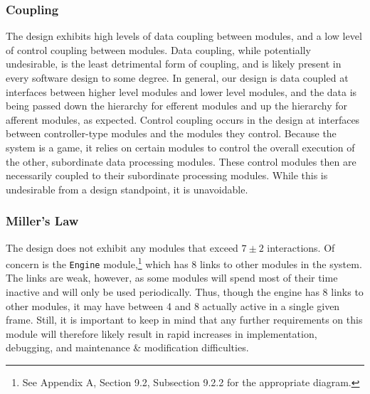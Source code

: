 \documentclass{article}
\begin{document}
		\subsubsection{Coupling}
			The design exhibits high levels of data coupling between modules, and a low level of control coupling between modules. Data coupling, while potentially undesirable, is the least detrimental form of coupling, and is likely present in every software design to some degree. In general, our design is data coupled at interfaces between higher level modules and lower level modules, and the data is being passed down the hierarchy for efferent modules and up the hierarchy for afferent modules, as expected. Control coupling occurs in the design at interfaces between controller-type modules and the modules they control. Because the system is a game, it relies on certain modules to control the overall execution of the other, subordinate data processing modules. These control modules then are necessarily coupled to their subordinate processing modules. While this is undesirable from a design standpoint, it is unavoidable. 
		\subsubsection{Miller's Law}
			The design does not exhibit any modules that exceed $7\pm2$ interactions. Of concern is the \texttt{Engine} module,\footnote{See Appendix A, Section 9.2, Subsection 9.2.2 for the appropriate diagram.} which has 8 links to other modules in the system. The links are weak, however, as some modules will spend most of their time inactive and will only be used periodically. Thus, though the engine has 8 links to other modules, it may have between 4 and 8 actually active in a single given frame. Still, it is important to keep in mind that any further requirements on this module will therefore likely result in rapid increases in implementation, debugging, and maintenance \& modification difficulties. 
			
\end{document}
